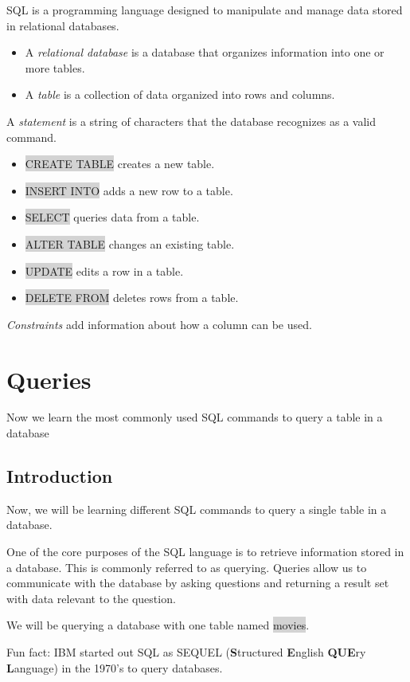 \documentclass[11pt]{article}
\begin{document}
SQL is a programming language designed to manipulate and manage data stored in relational databases.
\begin{itemize}
\item A \textit{relational database} is a database that organizes information into one or more tables.
\item A \textit{table} is a collection of data organized into rows and columns.
\end{itemize}
A \textit{statement} is a string of characters that the database recognizes as a valid command.
\begin{itemize}
\item \colorbox{lightgray}{CREATE TABLE} creates a new table.
\item \colorbox{lightgray}{INSERT INTO} adds a new row to a table.
\item \colorbox{lightgray}{SELECT} queries data from a table.
\item \colorbox{lightgray}{ALTER TABLE} changes an existing table.
\item \colorbox{lightgray}{UPDATE} edits a row in a table.
\item \colorbox{lightgray}{DELETE FROM} deletes rows from a table.
\end{itemize}
\textit{Constraints} add information about how a column can be used.

\newpage
\section{Queries}
Now we learn the most commonly used SQL commands to query a table in a database
\subsection{Introduction}
Now, we will be learning different SQL commands to query a single table in a database.

One of the core purposes of the SQL language is to retrieve information stored in a database. This is commonly referred to as querying. Queries allow us to communicate with the database by asking questions and returning a result set with data relevant to the question.

We will be querying a database with one table named \colorbox{lightgray}{movies}.

Fun fact: IBM started out SQL as SEQUEL (\textbf{S}tructured \textbf{E}nglish \textbf{QUE}ry \textbf{L}anguage) in the 1970’s to query databases.
\end{document}
